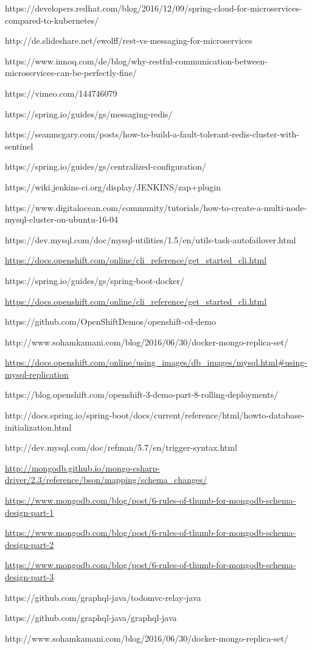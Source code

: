 https://developers.redhat.com/blog/2016/12/09/spring-cloud-for-microservices-compared-to-kubernetes/

http://de.slideshare.net/ewolff/rest-vs-messaging-for-microservices

https://www.innoq.com/de/blog/why-restful-communication-between-microservices-can-be-perfectly-fine/

https://vimeo.com/144746079

https://spring.io/guides/gs/messaging-redis/

https://seanmcgary.com/posts/how-to-build-a-fault-tolerant-redis-cluster-with-sentinel

https://spring.io/guides/gs/centralized-configuration/

https://wiki.jenkins-ci.org/display/JENKINS/zap+plugin

https://www.digitalocean.com/community/tutorials/how-to-create-a-multi-node-mysql-cluster-on-ubuntu-16-04

https://dev.mysql.com/doc/mysql-utilities/1.5/en/utils-task-autofailover.html

\url{https://docs.openshift.com/online/cli_reference/get_started_cli.html}

https://spring.io/guides/gs/spring-boot-docker/

\url{https://docs.openshift.com/online/cli_reference/get_started_cli.html}

https://github.com/OpenShiftDemos/openshift-cd-demo

http://www.sohamkamani.com/blog/2016/06/30/docker-mongo-replica-set/

\url{https://docs.openshift.com/online/using_images/db_images/mysql.html#using-mysql-replication}

https://blog.openshift.com/openshift-3-demo-part-8-rolling-deployments/

http://docs.spring.io/spring-boot/docs/current/reference/html/howto-database-initialization.html

http://dev.mysql.com/doc/refman/5.7/en/trigger-syntax.html

\url{http://mongodb.github.io/mongo-csharp-driver/2.3/reference/bson/mapping/schema_changes/}

\url{https://www.mongodb.com/blog/post/6-rules-of-thumb-for-mongodb-schema-design-part-1}

\url{https://www.mongodb.com/blog/post/6-rules-of-thumb-for-mongodb-schema-design-part-2}

\url{https://www.mongodb.com/blog/post/6-rules-of-thumb-for-mongodb-schema-design-part-3}

https://github.com/graphql-java/todomvc-relay-java

https://github.com/graphql-java/graphql-java

http://www.sohamkamani.com/blog/2016/06/30/docker-mongo-replica-set/